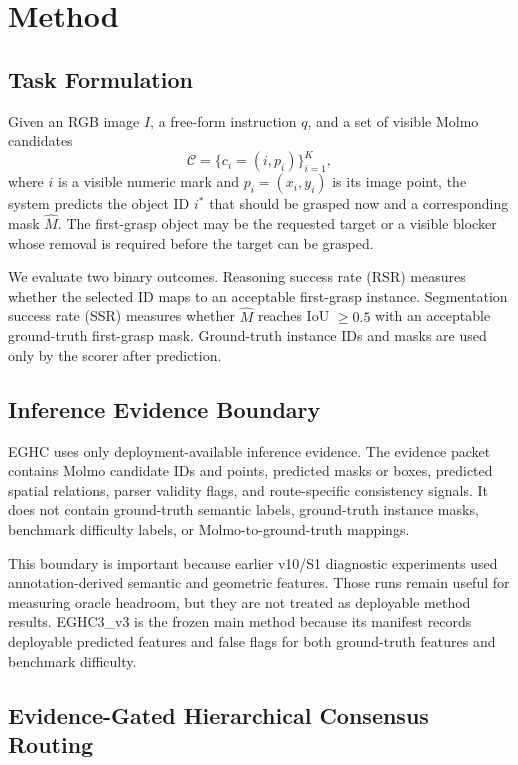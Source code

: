 \section{Method}

\subsection{Task Formulation}

Given an RGB image $I$, a free-form instruction $q$, and a set of visible Molmo candidates
\begin{equation}
\mathcal{C}=\{c_i=(i,p_i)\}_{i=1}^{K},
\end{equation}
where $i$ is a visible numeric mark and $p_i=(x_i,y_i)$ is its image point, the system predicts the object ID $i^{*}$ that should be grasped now and a corresponding mask $\hat{M}$. The first-grasp object may be the requested target or a visible blocker whose removal is required before the target can be grasped.

We evaluate two binary outcomes. Reasoning success rate (RSR) measures whether the selected ID maps to an acceptable first-grasp instance. Segmentation success rate (SSR) measures whether $\hat{M}$ reaches IoU $\geq 0.5$ with an acceptable ground-truth first-grasp mask. Ground-truth instance IDs and masks are used only by the scorer after prediction.

\subsection{Inference Evidence Boundary}

EGHC uses only deployment-available inference evidence. The evidence packet contains Molmo candidate IDs and points, predicted masks or boxes, predicted spatial relations, parser validity flags, and route-specific consistency signals. It does not contain ground-truth semantic labels, ground-truth instance masks, benchmark difficulty labels, or Molmo-to-ground-truth mappings.

This boundary is important because earlier v10/S1 diagnostic experiments used annotation-derived semantic and geometric features. Those runs remain useful for measuring oracle headroom, but they are not treated as deployable method results. EGHC3\_v3 is the frozen main method because its manifest records deployable predicted features and false flags for both ground-truth features and benchmark difficulty.

\subsection{Evidence-Gated Hierarchical Consensus Routing}

